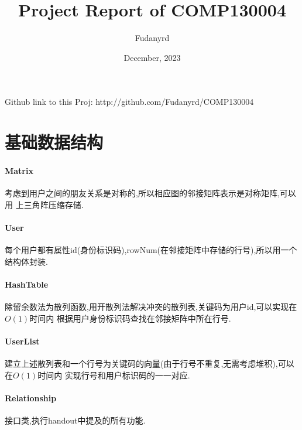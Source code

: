 \documentclass{article}
\title{Project Report of COMP130004}
\author{Fudanyrd}
\date{December, 2023}
\begin{document}
\begin{CJK*}{UTF8}{gbsn}
\maketitle
\par Github link to this Proj: http://github.com/Fudanyrd/COMP130004

\section{基础数据结构}

\paragraph{Matrix}
 考虑到用户之间的朋友关系是对称的,所以相应图的邻接矩阵表示是对称矩阵,可以用
上三角阵压缩存储.
\paragraph{User}
 每个用户都有属性id(身份标识码),rowNum(在邻接矩阵中存储的行号),所以用一个结构体封装.
\paragraph{HashTable}
除留余数法为散列函数,用开散列法解决冲突的散列表,关键码为用户id,可以实现在$O(1)$时间内
根据用户身份标识码查找在邻接矩阵中所在行号.
\paragraph{UserList}
建立上述散列表和一个行号为关键码的向量(由于行号不重复,无需考虑堆积),可以在$O(1)$时间内
实现行号和用户标识码的一一对应.
\paragraph{Relationship}
接口类,执行handout中提及的所有功能.

\end{CJK*}
\end{document}
